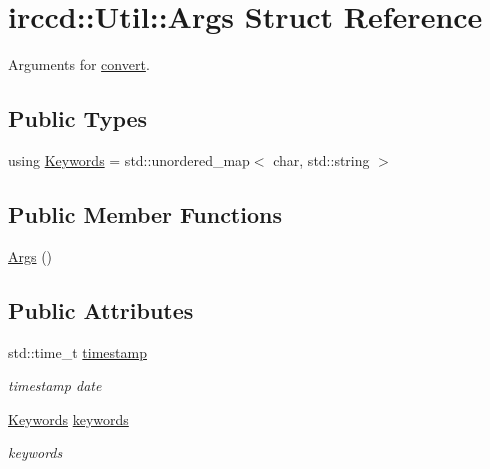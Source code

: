 \hypertarget{a00002}{\section{irccd\-:\-:Util\-:\-:Args Struct Reference}
\label{a00002}
}


Arguments for \hyperlink{a00069_a9214eb255c16d84fd26752530e2b5e94}{convert}.  


\subsection*{Public Types}
\begin{DoxyCompactItemize}
\item 
using \hyperlink{a00002_a27830527e842b7a4f5f8af255073e07e}{Keywords} = std\-::unordered\-\_\-map$<$ char, std\-::string $>$
\end{DoxyCompactItemize}
\subsection*{Public Member Functions}
\begin{DoxyCompactItemize}
\item 
\hyperlink{a00002_a28056e131b36ba1885068500744e4a64}{Args} ()
\end{DoxyCompactItemize}
\subsection*{Public Attributes}
\begin{DoxyCompactItemize}
\item 
\hypertarget{a00002_a24a5f3b4872f901cc29b99cf2dcb0925}{std\-::time\-\_\-t \hyperlink{a00002_a24a5f3b4872f901cc29b99cf2dcb0925}{timestamp}}\label{a00002_a24a5f3b4872f901cc29b99cf2dcb0925}

\begin{DoxyCompactList}\small\item\em timestamp date \end{DoxyCompactList}\item 
\hypertarget{a00002_ae9d4fab517d9931a541eaf6d68c46687}{\hyperlink{a00002_a27830527e842b7a4f5f8af255073e07e}{Keywords} \hyperlink{a00002_ae9d4fab517d9931a541eaf6d68c46687}{keywords}}\label{a00002_ae9d4fab517d9931a541eaf6d68c46687}

\begin{DoxyCompactList}\small\item\em keywords \end{DoxyCompactList}\end{DoxyCompactItemize}


